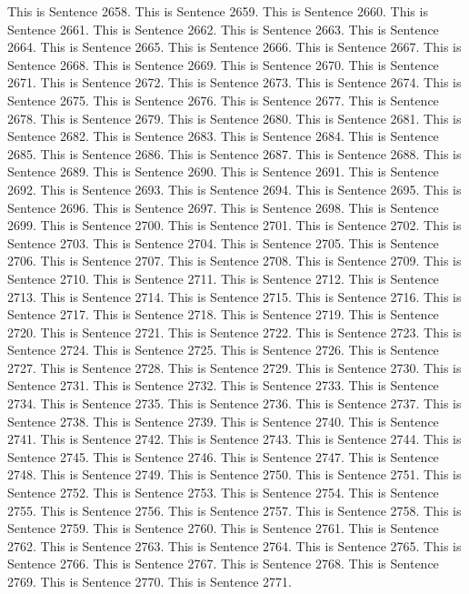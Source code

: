 \documentclass{article}
\begin{document}
This is Sentence 2658.
This is Sentence 2659.
This is Sentence 2660.
This is Sentence 2661.
This is Sentence 2662.
This is Sentence 2663.
This is Sentence 2664.
This is Sentence 2665.
This is Sentence 2666.
This is Sentence 2667.
This is Sentence 2668.
This is Sentence 2669.
This is Sentence 2670.
This is Sentence 2671.
This is Sentence 2672.
This is Sentence 2673.
This is Sentence 2674.
This is Sentence 2675.
This is Sentence 2676.
This is Sentence 2677.
This is Sentence 2678.
This is Sentence 2679.
This is Sentence 2680.
This is Sentence 2681.
This is Sentence 2682.
This is Sentence 2683.
This is Sentence 2684.
This is Sentence 2685.
This is Sentence 2686.
This is Sentence 2687.
This is Sentence 2688.
This is Sentence 2689.
This is Sentence 2690.
This is Sentence 2691.
This is Sentence 2692.
This is Sentence 2693.
This is Sentence 2694.
This is Sentence 2695.
This is Sentence 2696.
This is Sentence 2697.
This is Sentence 2698.
This is Sentence 2699.
This is Sentence 2700.
This is Sentence 2701.
This is Sentence 2702.
This is Sentence 2703.
This is Sentence 2704.
This is Sentence 2705.
This is Sentence 2706.
This is Sentence 2707.
This is Sentence 2708.
This is Sentence 2709.
This is Sentence 2710.
This is Sentence 2711.
This is Sentence 2712.
This is Sentence 2713.
This is Sentence 2714.
This is Sentence 2715.
This is Sentence 2716.
This is Sentence 2717.
This is Sentence 2718.
This is Sentence 2719.
This is Sentence 2720.
This is Sentence 2721.
This is Sentence 2722.
This is Sentence 2723.
This is Sentence 2724.
This is Sentence 2725.
This is Sentence 2726.
This is Sentence 2727.
This is Sentence 2728.
This is Sentence 2729.
This is Sentence 2730.
This is Sentence 2731.
This is Sentence 2732.
This is Sentence 2733.
This is Sentence 2734.
This is Sentence 2735.
This is Sentence 2736.
This is Sentence 2737.
This is Sentence 2738.
This is Sentence 2739.
This is Sentence 2740.
This is Sentence 2741.
This is Sentence 2742.
This is Sentence 2743.
This is Sentence 2744.
This is Sentence 2745.
This is Sentence 2746.
This is Sentence 2747.
This is Sentence 2748.
This is Sentence 2749.
This is Sentence 2750.
This is Sentence 2751.
This is Sentence 2752.
This is Sentence 2753.
This is Sentence 2754.
This is Sentence 2755.
This is Sentence 2756.
This is Sentence 2757.
This is Sentence 2758.
This is Sentence 2759.
This is Sentence 2760.
This is Sentence 2761.
This is Sentence 2762.
This is Sentence 2763.
This is Sentence 2764.
This is Sentence 2765.
This is Sentence 2766.
This is Sentence 2767.
This is Sentence 2768.
This is Sentence 2769.
This is Sentence 2770.
This is Sentence 2771.
\end{document}
